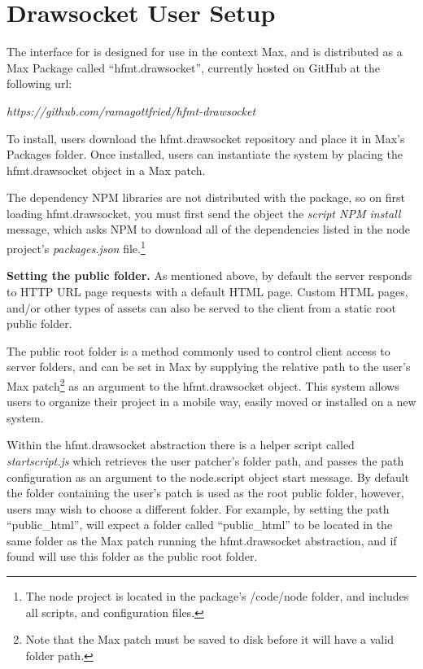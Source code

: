 \section{Drawsocket User Setup}\label{sec:setup}
The interface for \drawsocket is designed for use in the context Max, and is distributed as a Max Package called ``hfmt.drawsocket'', currently hosted on GitHub at the following url:

\textit{https://github.com/ramagottfried/hfmt-drawsocket}

To install, users download the hfmt.drawsocket repository and place it in Max's Packages folder. Once installed, users can instantiate the \drawsocket system by placing the hfmt.drawsocket object in a Max patch.

The dependency NPM libraries are not distributed with the package, so on first loading hfmt.drawsocket, you must first send the object the \textit{script NPM install} message, which asks NPM to download all of the dependencies listed in the node project's \textit{packages.json} file.\footnote{The node project is located in the package's /code/node folder, and includes all scripts, and configuration files.}

\medskip
\noindent
\textbf{Setting the public folder.}  As mentioned above, by default the \drawsocket server responds to HTTP URL page requests with a default HTML page. 
Custom HTML pages, and/or other types of assets can also be served to the client from a static root public folder. 

The public root folder is a method commonly used to control client access to server folders, and can be set in Max by supplying the relative path to the user's Max patch\footnote{Note that the Max patch must be saved to disk before it will have a valid folder path.} as an argument to the hfmt.drawsocket object.
This system allows users to organize their project in a mobile way, easily moved or installed on a new system.

Within the hfmt.drawsocket abstraction there is a helper script called \textit{startscript.js} which retrieves the user patcher's folder path, and passes the path configuration as an argument to the node.script object start message. 
By default the folder containing the user's patch is used as the root public folder, however, users may wish to choose a different folder. 
For example, by setting the path ``public\_html'', \drawsocket will expect a folder called ``public\_html'' to be located in the same folder as the Max patch running the hfmt.drawsocket abstraction, and if found will use this folder as the public root folder.

